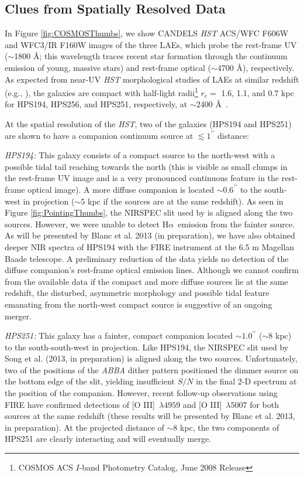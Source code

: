 \documentclass{emulateapj}
\newcommand{\ha}{H$\alpha$}
\newcommand{\oiii}{[O III]}
\def\arcsec{^{\prime\prime}}
\begin{document}
\subsection{Clues from Spatially Resolved Data}\label{subsec:Imaging}
In Figure \ref{fig:COSMOSThumbs}, we show CANDELS \textit{HST} ACS/WFC F606W and WFC3/IR F160W images of the three LAEs, which probe the rest-frame UV ($\sim$1800 \AA; this wavelength traces recent star formation through the continuum emission of young, massive stars) and rest-frame optical ($\sim$4700 \AA), respectively. As expected from near-UV \textit{HST} morphological studies of LAEs at similar redshift (e.g., \citealp{bond2012,law2012b}), the galaxies are compact with half-light radii\footnote[15]{COSMOS ACS $I$-band Photometry Catalog, June 2008 Release} $r_{e} =$ 1.6, 1.1, and 0.7 kpc for HPS194, HPS256, and HPS251, respectively, at $\sim$2400 \AA\ \citep{leauthaud2007}. 

At the spatial resolution of the \textit{HST}, two of the galaxies (HPS194 and HPS251) are shown to have a companion continuum source at $\lesssim 1\arcsec$ distance:

\textit{HPS194:} This galaxy consists of a compact source to the north-west with a possible tidal tail reaching towards the north (this is visible as small clumps in the rest-frame UV image and is a very pronounced continuous feature in the rest-frame optical image). A more diffuse companion is located $\sim0.6\arcsec$ to the south-west in projection ($\sim5$ kpc if the sources are at the same redshift). As seen in Figure \ref{fig:PointingThumbs}, the NIRSPEC slit used by \citet{finkelstein2011} is aligned along the two sources. However, we were unable to detect \ha\ emission from the fainter source. As will be presented by Blanc et al. 2013 (in preparation), we have also obtained deeper NIR spectra of HPS194 with the FIRE instrument \citep{simcoe2013} at the 6.5 m Magellan Baade telescope. A preliminary reduction of the data yields no detection of the diffuse companion's rest-frame optical emission lines. Although we cannot confirm from the available data if the compact and more diffuse sources lie at the same redshift, the disturbed, asymmetric morphology and possible tidal feature emanating from the north-west compact source is suggestive of an ongoing merger.

\textit{HPS251:} This galaxy has a fainter, compact companion located $\sim1.0\arcsec$ ($\sim8$ kpc) to the south-south-west in projection. Like HPS194, the NIRSPEC slit used by Song et al. (2013, in preparation) is aligned along the two sources. Unfortunately, two of the positions of the \textit{ABBA} dither pattern positioned the dimmer source on the bottom edge of the slit, yielding insufficient $S/N$ in the final 2-D spectrum at the position of the companion. However, recent follow-up observations using FIRE have confirmed detections of \oiii\ $\lambda4959$ and \oiii\ $\lambda5007$ for both sources at the same redshift (these results will be presented by Blanc et al. 2013, in preparation). At the projected distance of $\sim8$ kpc, the two components of HPS251 are clearly interacting and will eventually merge.
\end{document}

